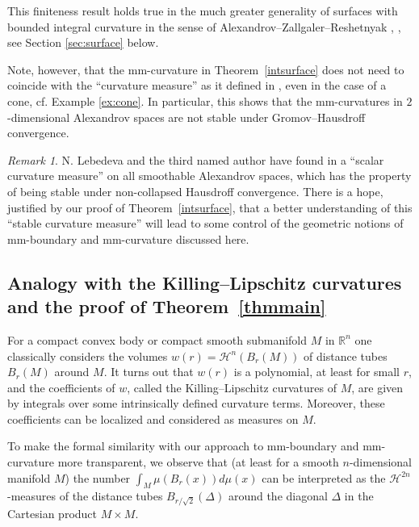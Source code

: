 \documentclass[12pt,leqno,intlimits]{amsart}
\numberwithin{equation}{section}
\theoremstyle{definition}
\theoremstyle{remark}
\newtheorem{rem}[thm]{Remark}
\newcommand{\tref}[1]{Theorem~\ref{#1}}
\newcommand{\R}{\mathbb{R}}
\begin{document}
This finiteness result holds true in the much greater generality of surfaces  with bounded integral curvature in the sense of Alexandrov--Zallgaler--Reshetnyak \cite{Reshetnyak-GeomIV}, \cite{AZ}, see Section \ref{sec:surface} below.

Note, however, that the mm-curvature
in \tref{intsurface} does not need to coincide with the ``curvature measure'' as it defined in \cite{Reshetnyak-GeomIV},   even in the case of a cone, cf. Example \ref{ex:cone}.  
In particular, this shows that the mm-curvatures in $2$-dimensional Alexandrov spaces are not stable under Gromov--Hausdroff convergence.


\begin{rem}
N. Lebedeva and the third named author have found in \cite{LP}  a ``scalar curvature measure'' on all smoothable Alexandrov spaces, which has the property of being stable
under non-collapsed Hausdroff convergence. There is a hope, justified by our proof of  \tref{intsurface}, that a better understanding of this ``stable curvature measure'' will
lead to some control of the geometric notions of mm-boundary and mm-curvature discussed here.
\end{rem}



\subsection{Analogy with the Killing--Lipschitz curvatures and the proof of \tref{thmmain}}
For a compact convex body or compact smooth submanifold $M$ in $\R^n$ one classically considers
the  volumes $w(r)=\mathcal H^n (B_r(M))$ of distance tubes $B_r(M)$ around $M$.
It turns out that $w(r)$ is a polynomial, at least for small $r$, and  the coefficients of
$w$, called the   Killing--Lipschitz curvatures of $M$, are given by  integrals over some intrinsically defined curvature
 terms.  Moreover, these coefficients can be localized and considered as measures on $M$.

To make the formal similarity with our approach  to mm-boundary and mm-curvature more transparent, we observe that
(at least for a smooth $n$-dimensional manifold $M$) the number   $\int _M \mu (B_r(x)) d\mu (x)$  can be interpreted as the $\mathcal H^{2n}$-measures
of the distance tubes $B_{r/\sqrt 2} (\Delta )$ around the diagonal $\Delta $ in the Cartesian product $M\times M$.
\end{document}
